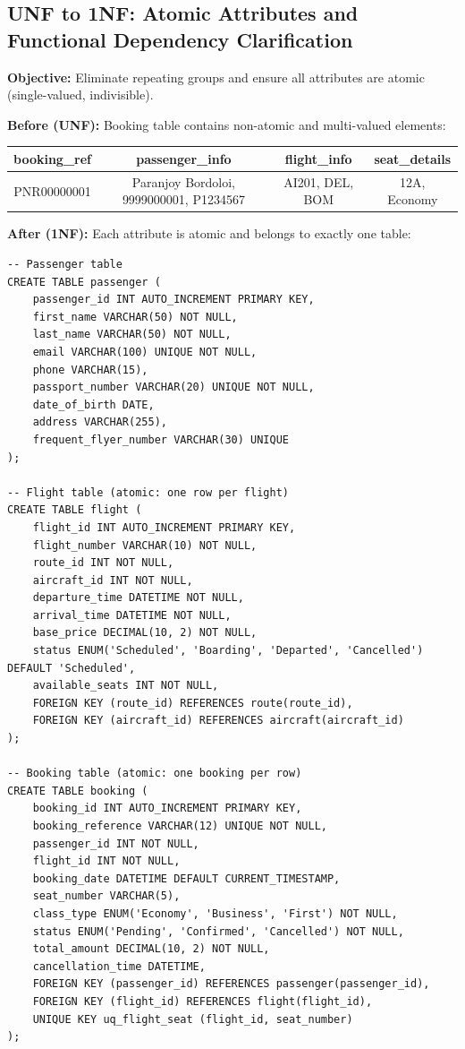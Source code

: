 \documentclass[12pt, a4paper]{article}
\begin{document}
\subsection{UNF to 1NF: Atomic Attributes and Functional Dependency Clarification}

\textbf{Objective:} Eliminate repeating groups and ensure all attributes are atomic (single-valued, indivisible).

\textbf{Before (UNF):} Booking table contains non-atomic and multi-valued elements:
\begin{center}
\small
\begin{tabular}{|c|c|c|c|}
\hline
\textbf{booking\_ref} & \textbf{passenger\_info} & \textbf{flight\_info} & \textbf{seat\_details} \\
\hline
PNR00000001 & Paranjoy Bordoloi, 9999000001, P1234567 & AI201, DEL, BOM & 12A, Economy \\
\hline
\end{tabular}
\end{center}

\textbf{After (1NF):} Each attribute is atomic and belongs to exactly one table:

\begin{lstlisting}[style=sqlstyle]
-- Passenger table
CREATE TABLE passenger (
    passenger_id INT AUTO_INCREMENT PRIMARY KEY,
    first_name VARCHAR(50) NOT NULL,
    last_name VARCHAR(50) NOT NULL,
    email VARCHAR(100) UNIQUE NOT NULL,
    phone VARCHAR(15),
    passport_number VARCHAR(20) UNIQUE NOT NULL,
    date_of_birth DATE,
    address VARCHAR(255),
    frequent_flyer_number VARCHAR(30) UNIQUE
);

-- Flight table (atomic: one row per flight)
CREATE TABLE flight (
    flight_id INT AUTO_INCREMENT PRIMARY KEY,
    flight_number VARCHAR(10) NOT NULL,
    route_id INT NOT NULL,
    aircraft_id INT NOT NULL,
    departure_time DATETIME NOT NULL,
    arrival_time DATETIME NOT NULL,
    base_price DECIMAL(10, 2) NOT NULL,
    status ENUM('Scheduled', 'Boarding', 'Departed', 'Cancelled') DEFAULT 'Scheduled',
    available_seats INT NOT NULL,
    FOREIGN KEY (route_id) REFERENCES route(route_id),
    FOREIGN KEY (aircraft_id) REFERENCES aircraft(aircraft_id)
);

-- Booking table (atomic: one booking per row)
CREATE TABLE booking (
    booking_id INT AUTO_INCREMENT PRIMARY KEY,
    booking_reference VARCHAR(12) UNIQUE NOT NULL,
    passenger_id INT NOT NULL,
    flight_id INT NOT NULL,
    booking_date DATETIME DEFAULT CURRENT_TIMESTAMP,
    seat_number VARCHAR(5),
    class_type ENUM('Economy', 'Business', 'First') NOT NULL,
    status ENUM('Pending', 'Confirmed', 'Cancelled') NOT NULL,
    total_amount DECIMAL(10, 2) NOT NULL,
    cancellation_time DATETIME,
    FOREIGN KEY (passenger_id) REFERENCES passenger(passenger_id),
    FOREIGN KEY (flight_id) REFERENCES flight(flight_id),
    UNIQUE KEY uq_flight_seat (flight_id, seat_number)
);
\end{lstlisting}
\end{document}
